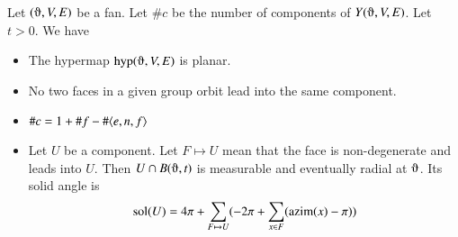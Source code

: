 \begin{lemma}
Let $(\orgn,V,E)$ be a fan.    
Let $\#c$ be the number
of components of $Y(\orgn,V,E)$.  Let $t>0$. We have
    \begin{itemize}
    \item The hypermap $\op{hyp}(\orgn,V,E)$ is planar.
    \item No two faces in a given group orbit lead
    into the same component.
    \item $\#c = 1 + \#f - \#\langle e,n,f\rangle$
    \item Let $U$ be a component. Let $F\mapsto U$ mean
    that the face is non-degenerate and leads into $U$.  
     Then $U \cap B(\orgn,t)$ 
       is measurable and eventually radial at $\orgn$.  Its solid angle is
        $${\operatorname{sol}}(U) = 4\pi + \sum_{F\mapsto U}(-2\pi + \sum_{x\in F}
        ({\operatorname{azim}}(x)-\pi))$$
    \end{itemize}
\end{lemma}

